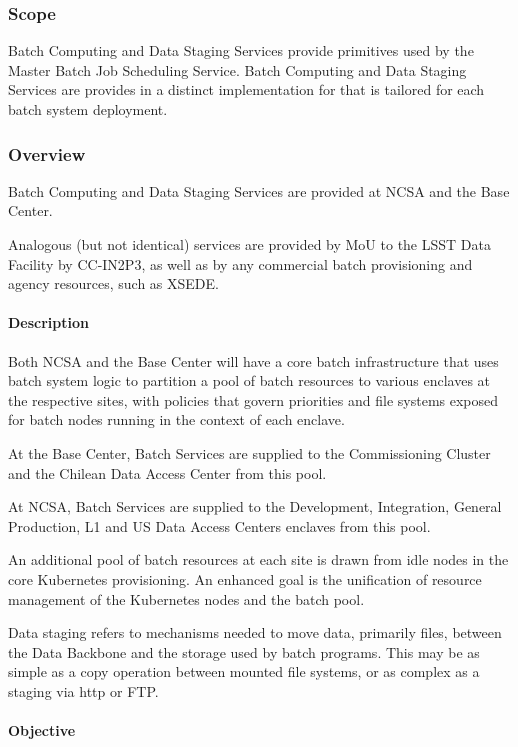 \subsubsection{Scope}

Batch Computing and Data Staging Services provide primitives
used by the Master Batch Job Scheduling Service. Batch Computing
and Data Staging Services are provides in a distinct implementation
for that is tailored for each batch system deployment.

\subsubsection{Overview}

Batch Computing and Data Staging Services are provided at NCSA and the Base Center.

Analogous (but not identical) services are provided by MoU to the LSST
Data Facility by CC-IN2P3, as well as by any commercial batch
provisioning and agency resources, such as XSEDE.

\paragraph{Description}

Both NCSA and the Base Center will have a core batch infrastructure that
uses batch system logic to partition a pool of batch resources to
various enclaves at the respective sites, with policies that govern
priorities and file systems exposed for batch nodes running in the
context of each enclave.

At the Base Center, Batch Services are supplied to the Commissioning
Cluster and the Chilean Data Access Center from this pool.

At NCSA, Batch Services are supplied to the Development, Integration,
General Production, L1 and US Data Access Centers enclaves from this pool.

An additional pool of batch resources at each site is drawn from idle nodes
in the core Kubernetes provisioning. An enhanced goal is the unification of
resource management of the Kubernetes nodes and the batch pool.

Data staging refers to mechanisms needed to move data, primarily files, between the
Data Backbone and the storage used by batch programs. This may be as simple
as a copy operation between mounted file systems, or as complex as a staging
via http or FTP.

\paragraph{Objective}

